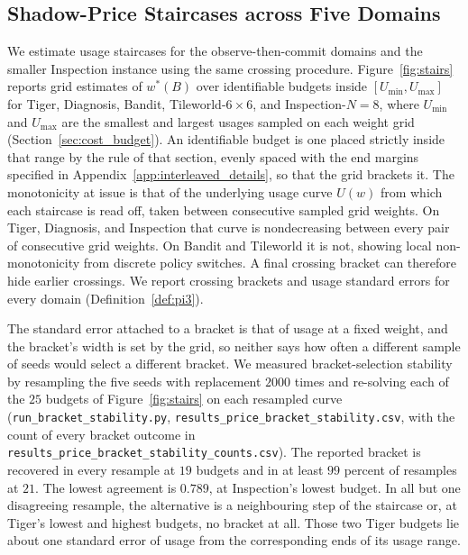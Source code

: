\documentclass[runningheads]{llncs}
\begin{document}
\subsection{Shadow-Price Staircases across Five Domains}
\label{sec:stairs}

We estimate usage staircases for the observe-then-commit domains and the smaller Inspection instance using the same crossing procedure. Figure~\ref{fig:stairs} reports grid estimates of $w^*(B)$ over identifiable budgets inside $[U_{\min}, U_{\max}]$ for Tiger, Diagnosis, Bandit, Tileworld-$6{\times}6$, and Inspection-$N{=}8$, where $U_{\min}$ and $U_{\max}$ are the smallest and largest usages sampled on each weight grid (Section~\ref{sec:cost_budget}). An identifiable budget is one placed strictly inside that range by the rule of that section, evenly spaced with the end margins specified in Appendix~\ref{app:interleaved_details}, so that the grid brackets it. The monotonicity at issue is that of the underlying usage curve $U(w)$ from which each staircase is read off, taken between consecutive sampled grid weights. On Tiger, Diagnosis, and Inspection that curve is nondecreasing between every pair of consecutive grid weights. On Bandit and Tileworld it is not, showing local non-monotonicity from discrete policy switches. A final crossing bracket can therefore hide earlier crossings. We report crossing brackets and usage standard errors for every domain (Definition~\ref{def:pi3}).

The standard error attached to a bracket is that of usage at a fixed weight, and the bracket's width is set by the grid, so neither says how often a different sample of seeds would select a different bracket. We measured bracket-selection stability by resampling the five seeds with replacement $2000$ times and re-solving each of the $25$ budgets of Figure~\ref{fig:stairs} on each resampled curve (\texttt{run\_\allowbreak bracket\_\allowbreak stability.py}, \texttt{results\_\allowbreak price\_\allowbreak bracket\_\allowbreak stability.csv}, with the count of every bracket outcome in \texttt{results\_\allowbreak price\_\allowbreak bracket\_\allowbreak stability\_\allowbreak counts.csv}). The reported bracket is recovered in every resample at $19$ budgets and in at least $99$ percent of resamples at $21$. The lowest agreement is $0.789$, at Inspection's lowest budget. In all but one disagreeing resample, the alternative is a neighbouring step of the staircase or, at Tiger's lowest and highest budgets, no bracket at all. Those two Tiger budgets lie about one standard error of usage from the corresponding ends of its usage range.
\end{document}
